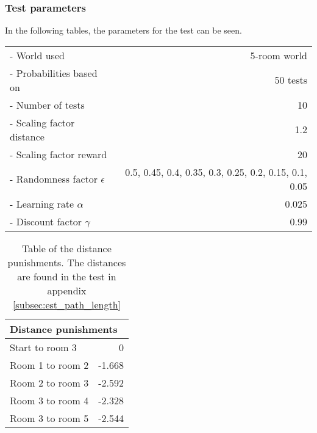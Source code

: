 \documentclass[../Head/Main.tex]{subfiles}
\begin{document}
\subsubsection*{Test parameters}
In the following tables, the parameters for the test can be seen.\\
\begin{minipage}[c]{0.69\textwidth}
	\begin{tabular}{l r}
	- World used                   & 5-room world\\
	- Probabilities based on       & 50 tests\\	
	- Number of tests              & 10\\
	- Scaling factor distance      & 1.2\\
	- Scaling factor reward        & 20\\
	- Randomness factor $\epsilon$ & 0.5, 0.45, 0.4, 0.35, 0.3, 0.25, 0.2, 0.15, 0.1, 0.05\\
	- Learning rate $\alpha$       & 0.025\\
	- Discount factor $\gamma$     & 0.99\\
	\end{tabular}
\end{minipage}
\hfill
\begin{minipage}[c]{0.3\textwidth}
	\begin{table}[H]
	\centering
	\begin{tabular}{l r}
		\hline
		\multicolumn{2}{l}{\textbf{Distance punishments}}\\ 			\hline
		Start to room 3   & 0\\
		Room 1 to room 2  & -1.668\\
		Room 2 to room 3  & -2.592\\
		Room 3 to room 4  & -2.328\\
		Room 3 to room 5  & -2.544\\
		\hline
	\end{tabular}
	\caption{Table of the distance punishments. The distances are found in the test in appendix \ref{subsec:est_path_length}}
	\label{tab:distance_punishment_5_rooms_2}
\end{table}
\end{minipage}

\clearpage
\end{document}
